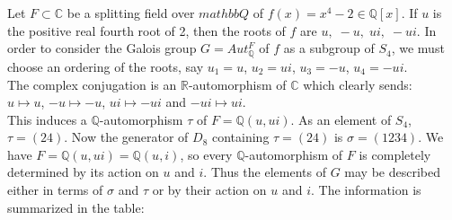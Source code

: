 Let \(F \subset \mathbb{C}\) be a splitting field over \(mathbb{Q}\) of \(f(x)=x^4-2 \in \mathbb{Q}[x]\). If \(u\) is the positive real fourth root of 2, then the roots 
of \(f\) are \(u,\; -u,\; ui,\; -ui\). In order to consider the Galois group \(G = Aut_{\mathbb{Q}}^F\) of \(f\) as a subgroup of \(S_4\), we must choose an ordering of the roots, say 
\(u_1=u\), \(u_2=ui\), \(u_3=-u\), \(u_4= -ui\). \\
The complex conjugation is an \(\mathbb{R}\)-automorphism of \(\mathbb{C}\) which clearly sends:\\
\(u \mapsto u\), \(-u \mapsto -u\), \(ui \mapsto -ui\) and \(-ui \mapsto ui\). \\
This induces a \(\mathbb{Q}\)-automorphism \(\tau\) of \(F=\mathbb{Q}(u,ui)\). As an element of \(S_4\), \(\tau=(24)\). 
Now the generator of \(D_8\) containing \(\tau = (24)\) is \(\sigma = (1234)\). We have \(F=\mathbb{Q}(u,ui)=\mathbb{Q}(u,i)\), 
so every \(\mathbb{Q}\)-automorphism of \(F\) is completely determined by its action on \(u\) and \(i\). Thus the elements of \(G\) 
may be described either in terms of \(\sigma\) and \(\tau\) or by their action on \(u\) and \(i\). The information is summarized in the table:









